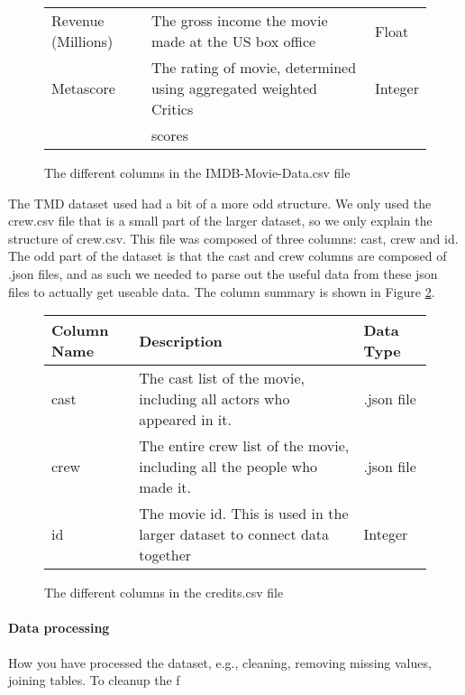 \begin{figure}[h]
\begin{tabular}[width = \textwidth]{lll}
                Revenue (Millions) &    The gross income the movie made at the US box office                        & Float \\  
                Metascore   &           The rating of movie, determined using aggregated weighted Critics           & Integer \\
                {}          &           scores                                                                      & {} \\         
                \bottomrule
            \end{tabular}
            \caption[short]{The different columns in the IMDB-Movie-Data.csv file}\label{fig-IMDB-Movie-Data-Column-Description}
        \end{figure}
        \newline
        The TMD dataset used had a bit of a more odd structure.
        We only used the crew.csv file that is a small part of the larger dataset, so we only explain the structure of crew.csv.
        This file was composed of three columns: cast, crew and id.
        The odd part of the dataset is that the cast and crew columns are composed of .json files, and as such we needed to parse 
            out the useful data from these json files to actually get useable data.
        The column summary is shown in Figure \ref*{fig-Credits-Column-Description}.
        \begin{figure}[h]
            \centering
            \begin{tabular}[width = \textwidth]{lll}
                \toprule
                Column Name &           Description                                                                 & Data Type  \\
                \midrule
                cast &                  The cast list of the movie, including all actors who appeared in it.        & .json file \\          
                crew &                  The entire crew list of the movie, including all the people who made it.    & .json file \\
                id &                    The movie id. This is used in the larger dataset to connect data together   & Integer     \\        
                \bottomrule
            \end{tabular}
            \caption[short]{The different columns in the credits.csv file}\label{fig-Credits-Column-Description}
        \end{figure}

    \paragraph{Data processing}
        How you have processed the dataset, e.g., cleaning, removing missing values,
            joining tables.
        To cleanup the f
